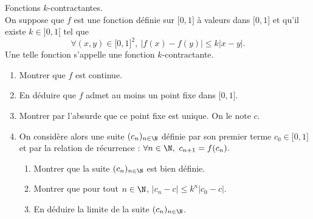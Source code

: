 



\begin{exercice}  \;
Fonctions $k$-contractantes.\\
\noindent On suppose que $f$ est une fonction d\'efinie sur $\lbrack 0,1\rbrack$ \`a valeurs dans $\lbrack 0,1\rbrack$ et qu'il existe $k\in\rbrack 0,1\lbrack$ tel que
$$\forall (x,y)\in\lbrack 0,1\rbrack^2,\ |f(x)-f(y)|\leq k|x-y|.$$
Une telle fonction s'appelle une fonction $k$-contractante.
\begin{enumerate}
\item Montrer que $f$ est continue. 
\item En déduire que $f$ admet au moins un point fixe dans $\lbrack 0,1\rbrack$. 
\item Montrer par l'absurde que ce point fixe est unique. On le note $c$.  

\item 
On consid\`ere alors une suite $(c_n)_{n\in\N}$ d\'efinie par son premier terme $c_0\in\lbrack 0,1\rbrack$ et par la relation de r\'ecurrence  : $\forall n\in\N,\ c_{n+1}=f(c_n).$
\begin{enumerate}
\item Montrer que la suite $(c_n)_{n\in\N}$ est bien d\'efinie.
\item Montrer que pour tout $n\in\N$, $|c_n-c|\leq k^n|c_0-c|$. 
\item En d\'eduire la limite de la suite $(c_n)_{n\in\N}$.
\end{enumerate}
\end{enumerate}
\end{exercice}


